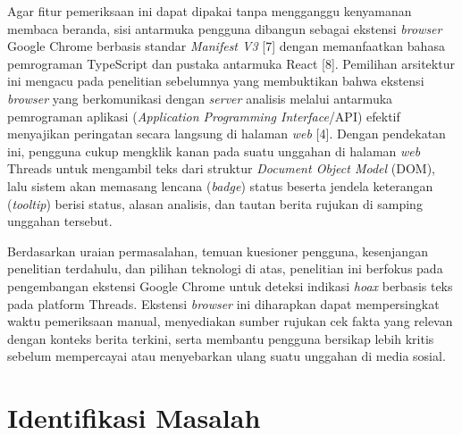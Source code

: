 \documentclass[12pt,a4paper,twoside]{report}
\begin{document}
Agar fitur pemeriksaan ini dapat dipakai tanpa mengganggu kenyamanan membaca beranda, sisi antarmuka pengguna dibangun sebagai ekstensi \textit{browser} Google Chrome berbasis standar \textit{Manifest V3} [7] dengan memanfaatkan bahasa pemrograman TypeScript dan pustaka antarmuka React [8]. Pemilihan arsitektur ini mengacu pada penelitian sebelumnya yang membuktikan bahwa ekstensi \textit{browser} yang berkomunikasi dengan \textit{server} analisis melalui antarmuka pemrograman aplikasi (\textit{Application Programming Interface}/API) efektif menyajikan peringatan secara langsung di halaman \textit{web} [4]. Dengan pendekatan ini, pengguna cukup mengklik kanan pada suatu unggahan di halaman \textit{web} Threads untuk mengambil teks dari struktur \textit{Document Object Model} (DOM), lalu sistem akan memasang lencana (\textit{badge}) status beserta jendela keterangan (\textit{tooltip}) berisi status, alasan analisis, dan tautan berita rujukan di samping unggahan tersebut.

Berdasarkan uraian permasalahan, temuan kuesioner pengguna, kesenjangan penelitian terdahulu, dan pilihan teknologi di atas, penelitian ini berfokus pada pengembangan ekstensi Google Chrome untuk deteksi indikasi \textit{hoax} berbasis teks pada platform Threads. Ekstensi \textit{browser} ini diharapkan dapat mempersingkat waktu pemeriksaan manual, menyediakan sumber rujukan cek fakta yang relevan dengan konteks berita terkini, serta membantu pengguna bersikap lebih kritis sebelum mempercayai atau menyebarkan ulang suatu unggahan di media sosial.

\section{Identifikasi Masalah}
\end{document}
